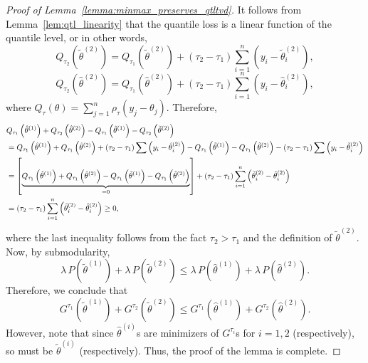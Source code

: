 \documentclass[11pt]{article}
\theoremstyle{plain}
\theoremstyle{definition}
\theoremstyle{remark}
\begin{document}
 \begin{proof}[Proof of Lemma~\ref{lemma:minmax_preserves_qtltvd}]
It follows from Lemma~\ref{lem:qtl_linearity} that the quantile loss is a linear function of the quantile level, or in other words, 
$$Q_{\tau_{2}}\left(\tilde{\theta}^{(2)}\right)=Q_{\tau_{1}}\left(\tilde{\theta}^{(2)}\right)+\left(\tau_{2}-\tau_{1}\right) \sum_{i=1}^{n}\left(y_{i}-\tilde{\theta}^{(2)}_{i}\right),$$
$$Q_{\tau_{2}}\left(\hat{\theta}^{(2)}\right)=Q_{\tau_{1}}\left(\hat{\theta}^{(2)}\right)+\left(\tau_{2}-\tau_{1}\right) \sum_{i=1}^{n}\left(y_{i}-\hat{\theta}_{i}^{(2)}\right),$$
where $Q_{\tau}(\theta)=\sum_{j=1}^n \rho_{\tau}(y_j-\theta_j)$.
Therefore, 
\begin{align}\label{eqn:qtl_loss_decomposition}
&Q_{\tau_{1}}\left(\hat{\theta}^{(1)}\right)+Q_{\tau_{2}}\left(\hat{\theta}^{(2)}\right) 
-  Q_{\tau_{1}}\left(\tilde{\theta}^{(1)}\right)-Q_{\tau_{2}}\left(\tilde{\theta}^{(2)}\right) \nonumber\\
 &= Q_{\tau_{1}}\left(\hat{\theta}^{(1)}\right)+Q_{\tau_{1}}\left(\hat{\theta}^{(2)}\right)+\left(\tau_{2}-\tau_{1}\right) \sum\left(y_{i}-\hat{\theta}_{i}^{(2)}\right) -Q_{\tau_{1}}\left(\tilde{\theta}^{(1)}\right)-Q_{\tau_{1}}\left(\tilde{\theta}^{(2)}\right) 
 -\left(\tau_{2}-\tau_{1}\right) \sum\left(y_{i}-\tilde{\theta}^{(2)}_i\right) \allowdisplaybreaks\nonumber\\
&= \left[\underbrace{Q_{\tau_{1}}\left(\hat{\theta}^{(1)}\right)+Q_{\tau_{1}}\left(\hat{\theta}^{(2)}\right)-Q_{\tau_{1}}\left(\tilde{\theta}^{(1)}\right)-Q_{\tau_{1}}\left(\tilde{\theta}^{(2)}\right)}_{=0}\right]  +\left(\tau_{2}-\tau_{1}\right) \sum_{i=1}^{n}\left(\tilde{\theta}^{(2)}_i-\hat{\theta}_{i}^{(2)}\right)\allowdisplaybreaks\nonumber\\
&=\left(\tau_{2}-\tau_{1}\right) \sum_{i=1}^{n}\left(\tilde{\theta}^{(2)}_i-\hat{\theta}_{i}^{(2)}\right)\geq 0,
\end{align}
where the last inequality follows from the fact $\tau_2>\tau_1$ and the definition of $\tilde{\theta}^{(2)}.$ Now, by submodularity,
\begin{equation}\label{eqn:submodular_lattice}
\lambda\,P(\tilde{\theta}^{(1)})+\lambda\,P(\tilde{\theta}^{(2)})\leq \lambda\,P(\hat{\theta}^{(1)})+\lambda\,P(\hat{\theta}^{(2)}).
\end{equation}
Therefore, we conclude that
\[G^{\tau_1}(\tilde{\theta}^{(1)})+G^{\tau_2}(\tilde{\theta}^{(2)})\leq G^{\tau_1}(\hat{\theta}^{(1)})+G^{\tau_2}(\hat{\theta}^{(2)}).\]
However, note that since $\hat{\theta}^{(i)}$s are minimizers of $G^{\tau_i}$s for $i=1,2$ (respectively), so must be $\tilde{\theta}^{(i)}$ (respectively). Thus, the proof of the lemma is complete. 
 \end{proof}
\end{document}

